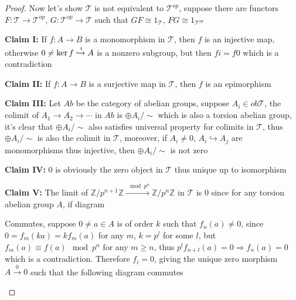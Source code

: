\documentclass[main]{subfiles}
\begin{document}
\begin{proof}
Now let's show $\mathcal T$ is not equivalent to $\mathcal T^{op}$, suppose there are functors $F:\mathcal T\to\mathcal T^{op}$, $G:\mathcal T^{op}\to\mathcal T$ such that $GF\cong1_{\mathcal T}$, $FG\cong1_{\mathcal T^{op}}$ \par
\textbf{Claim I: }If $f:A\to B$ is a monomorphism in $\mathcal T$, then $f$ is an injective map, otherwise $0\neq\ker f\xhookrightarrow{i} A$ is a nonzero subgroup, but then $fi=f0$ which is a contradiction \par
\textbf{Claim II: }If $f:A\to B$ is a surjective map in $\mathcal T$, then $f$ is an epimorphism \par
\textbf{Claim III: }Let $Ab$ be the category of abelian groups, suppose $A_i\in ob\mathcal T$, the colimit of $A_1\to A_2\to\cdots$ in $Ab$ is $\oplus A_i/\sim$ which is also a torsion abelian group, it's clear that $\oplus A_i/\sim$ also satisfies universal property for colimits in $\mathcal T$, thus $\oplus A_i/\sim$ is also the colimit in $\mathcal T$, moreover, if $A_i\neq0$, $A_i\hookrightarrow A_j$ are monomorphisms thus injective, then $\oplus A_i/\sim$ is not zero \par
\textbf{Claim IV: }$0$ is obviously the zero object in $\mathcal T$ thus unique up to isomorphism \par
\textbf{Claim V: }The limit of $\mathbb Z/p^{n+1}\mathbb Z\xrightarrow{\mod p^n}\mathbb Z/p^n\mathbb Z$ in $\mathcal T$ is $0$ since for any torsion abelian group $A$, if diagram
\begin{center}
\end{center}
Commutes, suppose $0\neq a\in A$ is of order $k$ such that $f_n(a)\neq0$, since $0=f_m(ka)=kf_m(a)$ for any $m$, $k=p^l$ for some $l$, but $f_m(a)\equiv f(a)\mod p^n$ for any $m\geq n$, thus $p^lf_{n+l}(a)=0\Rightarrow f_n(a)=0$ which is a contradiction. Therefore $f_i=0$, giving the unique zero morphism $A\xrightarrow{0}0$ such that the following diagram commutes \par
\begin{center}
\end{center}
\end{proof}
\end{document}
